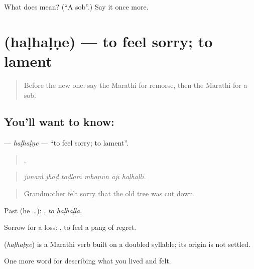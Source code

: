 \begin{tcolorbox}[breakable,colback=teal!4,colframe=teal!35!black,title={Before you move on}]
What does  mean? (\textquotedblleft{}A sob\textquotedblright{}.) Say it once more.
\end{tcolorbox}
\section[\texorpdfstring{\mr{हळहळणे} (haḷhaḷṇe)}{हळहळणे (haḷhaḷṇe)}]{ (haḷhaḷṇe) — to feel sorry; to lament}

\label{lesson:MR-C457-halhalne}



\begin{quote}
Before the new one: say the Marathi for remorse, then the Marathi for a sob.
\end{quote}

\subsection*{You'll want to know: }
\textbf{} — \emph{haḷhaḷṇe} — \textquotedblleft{}to feel sorry; to lament\textquotedblright{}.

\begin{quote}
     .
\end{quote}

\begin{quote}
\emph{junaṁ jhāḍ toḍlaṁ mhaṇūn ājī haḷhaḷlī.}
\end{quote}

\begin{quote}
Grandmother felt sorry that the old tree was cut down.
\end{quote}

Past (he …):  , \emph{to haḷhaḷlā}.

Sorrow for a loss:  , to feel a pang of regret.

\begin{cousinweb}
\textbf{} (\emph{haḷhaḷṇe}) is a Marathi verb built on a doubled syllable; its origin is not settled.
\end{cousinweb}

\begin{grammarlens}[title={What you've built}]
One more word for describing what you lived and felt.
\end{grammarlens}

